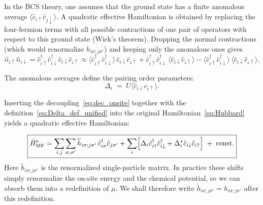 \documentclass[11pt,a4paper,twoside,openany]{report}
\begin{document}
In the BCS theory, one assumes that the ground state has a finite anomalous average $\langle \hat{c}_{i\uparrow} \hat{c}_{j\downarrow}\rangle$. A quadratic effective Hamiltonian is obtained by replacing the four-fermion terms with all possible contractions of one pair of operators with respect to this ground state (Wick's theorem). Dropping the normal contractions (which would renormalize $h_{i\sigma;j\sigma'}$) and keeping only the anomalous ones gives
\begin{equation}
  \hat{n}_{i\uparrow}\hat{n}_{i\downarrow}
  = \hat{c}_{i\uparrow}^\dagger \hat{c}_{i\downarrow}^\dagger \hat{c}_{i\downarrow} \hat{c}_{i\uparrow}\approx  \langle\hat{c}_{i\uparrow}^\dagger \hat{c}_{i\downarrow}^\dagger\rangle\,
            \hat{c}_{i\downarrow} \hat{c}_{i\uparrow}
          + \hat{c}_{i\uparrow}^\dagger \hat{c}_{i\downarrow}^\dagger\,
            \langle\hat{c}_{i\downarrow} \hat{c}_{i\uparrow}\rangle
          - \langle\hat{c}_{i\uparrow}^\dagger \hat{c}_{i\downarrow}^\dagger\rangle\,
            \langle\hat{c}_{i\downarrow} \hat{c}_{i\uparrow}\rangle .
          \label{eq:dec_onsite}
\end{equation}


The anomalous averages define the pairing order parameters:
\begin{equation}
\boxed{
  \Delta_{i} \;=\; U \langle\hat{c}_{i\downarrow}\hat{c}_{i\uparrow}\rangle .
}
\label{eq:Delta_def_unified}
\end{equation}

Inserting the decoupling~\eqref{eq:dec_onsite} together with the definition~\eqref{eq:Delta_def_unified} into the original Hamiltonian~\eqref{eq:Hubbard} yields a quadratic effective Hamiltonian:

\begin{equation}
\boxed{
    \hat{H}_{\mathrm{MF}}^{\mathrm{s}} = \sum_{i,j}\sum_{\sigma,\sigma'} \widetilde{h}_{i\sigma;j\sigma'}\, \hat{c}_{i\sigma}^\dagger \hat{c}_{j\sigma'}
    + \sum_i \Bigl[ \Delta_i \hat{c}_{i\uparrow}^\dagger \hat{c}_{i\downarrow}^\dagger
    + \Delta_i^* \hat{c}_{i\downarrow} \hat{c}_{i\uparrow} \Bigr]\;+\; \text{const.}
}
\label{eq:H_MF_s-wave}
\end{equation}
Here \(\widetilde{h}_{i\sigma;j\sigma'}\) is the renormalized single-particle matrix. In practice these shifts simply renormalize the on-site energy and the chemical potential, so we can absorb them into a redefinition of \(\mu\).  We shall therefore write \(\widetilde{h}_{i\sigma;j\sigma'}=h_{i\sigma;j\sigma'}\) after this redefinition.
\end{document}
